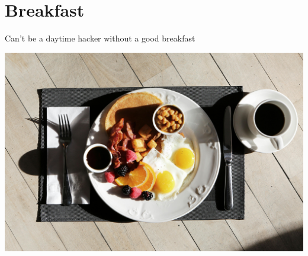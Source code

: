 \chapter{Breakfast}

Can't be a daytime hacker without a good breakfast
   
\centering
\includegraphics{images/pexels-photo-101533.jpg}
